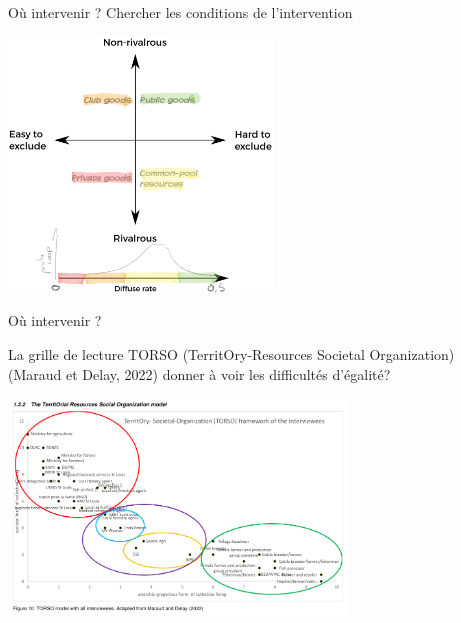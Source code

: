 \documentclass[newPxFont]{beamer}
\begin{document}
\begin{frame}[c]{Où intervenir ?}
  \vspace{-1cm}
  Chercher les conditions de l'intervention
  \begin{center}
  \includegraphics[width=7cm]{img/matrix_commons-proj42.pdf}
  \end{center}
\end{frame}

\begin{frame}[c]{Où intervenir ?}
    \vspace{-1cm}

   La grille de lecture TORSO (TerritOry-Resources Societal Organization) (Maraud et Delay, 2022) donner à voir les difficultés d'égalité? 
  \begin{center}
   \includegraphics[width=9cm]{img/torso_mathilde.png}
  \end{center}

\end{frame}
\end{document}
